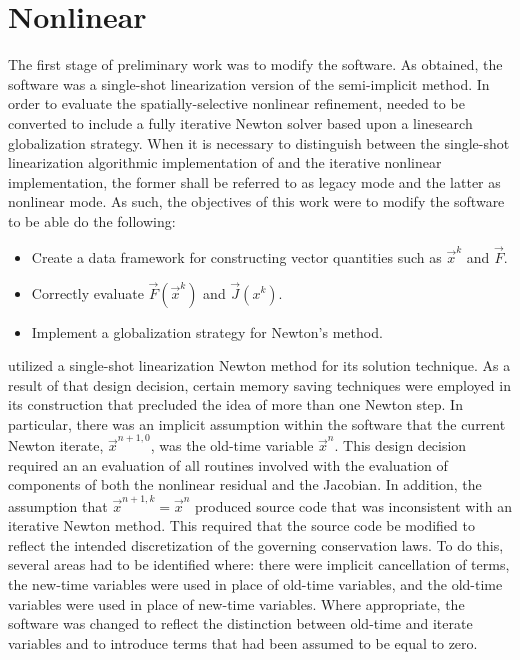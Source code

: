 \section{Nonlinear \cobra{}}
\label{sect:nl_cobra}
The first stage of preliminary work was to modify the \cobra{} software.
As obtained, the \cobra{} software was a single-shot linearization version of the semi-implicit method.
In order to evaluate the spatially-selective nonlinear refinement, \cobra{} needed to be converted to include a fully iterative Newton solver based upon a linesearch globalization strategy.
When it is necessary to distinguish between the single-shot linearization algorithmic implementation of \cobra{} and the iterative nonlinear \cobra{} implementation, the former shall be referred to as legacy mode and the latter as nonlinear mode.
As such, the objectives of this work were to modify the software to be able do the following:

\begin{itemize}
\item{Create a data framework for constructing vector quantities such as $\vec{x}^{k}$ and $\vec{F}$.}
\item{Correctly evaluate $\vec{F}(\vec{x}^{k})$ and $\vec{J}(x^{k})$.}
\item{Implement a globalization strategy for Newton's method.}
\end{itemize}

\cobra{} utilized a single-shot linearization Newton method for its solution technique.
As a result of that design decision, certain memory saving techniques were employed in its construction that precluded the idea of more than one Newton step.
In particular, there was an implicit assumption within the software that the current Newton iterate, $\vec{x}^{n+1, 0}$, was the old-time variable $\vec{x}^{n}$.
This design decision required an an evaluation of all routines involved with the evaluation of components of both the nonlinear residual and the Jacobian.
In addition, the assumption that $\vec{x}^{n+1, k} = \vec{x}^{n}$ produced source code that was inconsistent with an iterative Newton method.
This required that the source code be modified to reflect the intended discretization of the governing conservation laws.
To do this, several areas had to be identified where: there were implicit cancellation of terms, the new-time variables were used in place of old-time variables, and the old-time variables were used in place of new-time variables.
Where appropriate, the software was changed to reflect the distinction between old-time and iterate variables and to introduce terms that had been assumed to be equal to zero.

